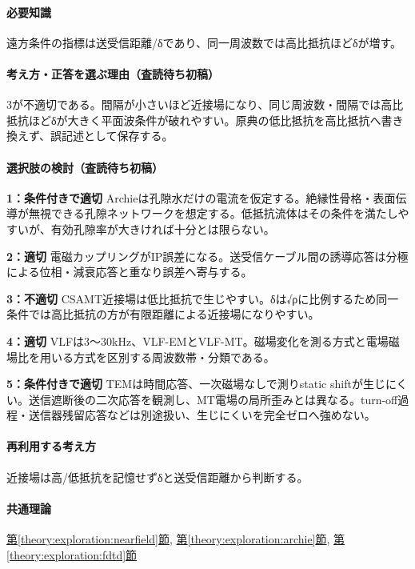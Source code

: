 \paragraph{必要知識} 遠方条件の指標は送受信距離/δであり、同一周波数では高比抵抗ほどδが増す。

\paragraph{考え方・正答を選ぶ理由（査読待ち初稿）} 3が不適切である。間隔が小さいほど近接場になり、同じ周波数・間隔では高比抵抗ほどδが大きく平面波条件が破れやすい。原典の低比抵抗を高比抵抗へ書き換えず、誤記述として保存する。

\paragraph{選択肢の検討（査読待ち初稿）}\mbox{}\par

\noindent\textbf{1：条件付きで適切} Archieは孔隙水だけの電流を仮定する。絶縁性骨格・表面伝導が無視できる孔隙ネットワークを想定する。低抵抗流体はその条件を満たしやすいが、有効孔隙率が大きければ十分とは限らない。\par

\noindent\textbf{2：適切} 電磁カップリングがIP誤差になる。送受信ケーブル間の誘導応答は分極による位相・減衰応答と重なり誤差へ寄与する。\par

\noindent\textbf{3：不適切} CSAMT近接場は低比抵抗で生じやすい。δは√ρに比例するため同一条件では高比抵抗の方が有限距離による近接場になりやすい。\par

\noindent\textbf{4：適切} VLFは3〜30kHz、VLF-EMとVLF-MT。磁場変化を測る方式と電場磁場比を用いる方式を区別する周波数帯・分類である。\par

\noindent\textbf{5：条件付きで適切} TEMは時間応答、一次磁場なしで測りstatic shiftが生じにくい。送信遮断後の二次応答を観測し、MT電場の局所歪みとは異なる。turn-off過程・送信器残留応答などは別途扱い、生じにくいを完全ゼロへ強めない。\par

\paragraph{再利用する考え方} 近接場は高/低抵抗を記憶せずδと送受信距離から判断する。

\paragraph{共通理論} \hyperref[theory:exploration:nearfield]{第\ref*{theory:exploration:nearfield}節}, \hyperref[theory:exploration:archie]{第\ref*{theory:exploration:archie}節}, \hyperref[theory:exploration:fdtd]{第\ref*{theory:exploration:fdtd}節}

